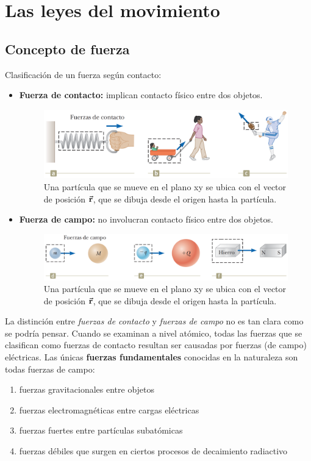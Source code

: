 \section{Las leyes del movimiento}
  \subsection{Concepto de fuerza}
    \PN Clasificación de un fuerza según contacto:
    \begin{itemize}
      \item \textbf{Fuerza de contacto:} implican contacto físico entre dos objetos.
        \begin{figure}[H]
          \centering
          \includegraphics[scale=0.4]{1/graphics_5/figure_0}
          \caption{Una partícula que se mueve en el plano xy se ubica con el vector de posición $\vec{\mathbf{r}}$, que se dibuja
          desde el origen hasta la partícula.}
        \end{figure}

      \item \textbf{Fuerza de campo:} no involucran contacto físico entre dos objetos.
        \begin{figure}[H]
          \centering
          \includegraphics[scale=0.4]{1/graphics_5/figure_1}
          \caption{Una partícula que se mueve en el plano xy se ubica con el vector de posición $\vec{\mathbf{r}}$, que se dibuja
          desde el origen hasta la partícula.}
        \end{figure}
    \end{itemize}

    \PN La distinción entre \textit{fuerzas de contacto} y \textit{fuerzas de campo} no es tan clara como se podría
    pensar. Cuando se examinan a nivel atómico, todas las fuerzas que se clasifican como fuerzas de contacto resultan
    ser causadas por fuerzas (de campo) eléctricas. Las únicas \textbf{fuerzas fundamentales} conocidas en la naturaleza
    son todas fuerzas de campo:
    \begin{enumerate}
      \item fuerzas gravitacionales entre objetos
      \item fuerzas electromagnéticas entre cargas eléctricas
      \item fuerzas fuertes entre partículas subatómicas
      \item fuerzas débiles que surgen en ciertos procesos de decaimiento radiactivo
    \end{enumerate}

